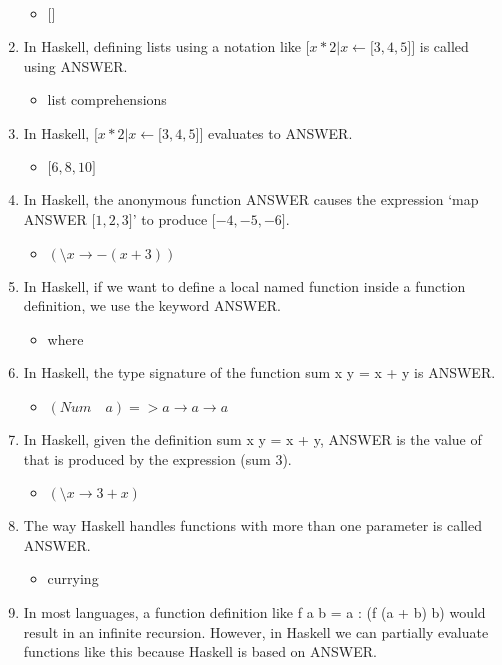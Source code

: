 \documentclass{exam}
\begin{document}
\begin{enumerate}
\begin{itemize}
\item $\lbrack\rbrack$
\end{itemize}
\item In Haskell, defining lists using a notation like $\lbrack x * 2 | x \leftarrow \lbrack 3, 4, 5\rbrack \rbrack$ is called using ANSWER.
\begin{itemize}
\item list comprehensions
\end{itemize}
\item In Haskell, $\lbrack x * 2 | x \leftarrow \lbrack 3, 4, 5\rbrack \rbrack$  evaluates to ANSWER.
\begin{itemize}
\item $\lbrack 6, 8, 10\rbrack$
\end{itemize}
\item In Haskell, the anonymous function ANSWER causes the expression `map ANSWER $\lbrack 1, 2, 3\rbrack$' to produce $\lbrack -4, -5, -6\rbrack$.
\begin{itemize}
\item $(\setminus x \rightarrow - (x + 3))$
\end{itemize}
\item In Haskell, if we want to define a local named function inside a function definition, we use the keyword ANSWER.
\begin{itemize}
\item where
\end{itemize}
\item In Haskell, the type signature of the function sum x y = x + y is ANSWER.
\begin{itemize}
\item $(Num \quad a) => a \rightarrow a \rightarrow a$
\end{itemize}
\item In Haskell, given the definition sum x y = x + y, ANSWER is the value of that is produced by the expression (sum 3).
\begin{itemize}
\item $(\setminus x \rightarrow 3 + x)$
\end{itemize}
\item The way Haskell handles functions with more than one parameter is called ANSWER.
\begin{itemize}
\item currying
\end{itemize}
\item In most languages, a function definition like f a b = a : (f (a + b) b) would result in an infinite recursion.  However, in Haskell we can partially evaluate functions like this because Haskell is based on ANSWER.

\end{enumerate}
\end{document}
